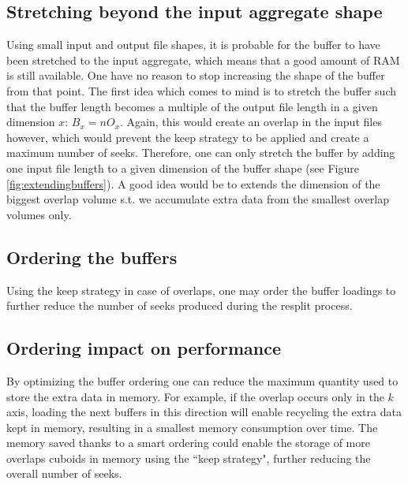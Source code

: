 \documentclass[conference]{IEEEtran}
\begin{document}
\subsection{Stretching beyond the input aggregate shape}

Using small input and output file shapes, it is probable for the buffer to have been stretched to the input aggregate, which means that a good amount of RAM is still available.
One have no reason to stop increasing the shape of the buffer from that point.
The first idea which comes to mind is to stretch the buffer such that the buffer length becomes a multiple of the output file length in a given dimension $x$: $B_x = nO_x$.
Again, this would create an overlap in the input files however, which would prevent the keep strategy to be applied and create a maximum number of seeks.
Therefore, one can only stretch the buffer by adding one input file length to a given dimension of the buffer shape (see Figure \ref{fig:extendingbuffers}).
A good idea would be to extends the dimension of the biggest overlap volume s.t. we accumulate extra data from the smallest overlap volumes only.

\subsection{Ordering the buffers}

Using the keep strategy in case of overlaps, one may order the buffer loadings to further reduce the number of seeks produced during the resplit process.

\subsection{Ordering impact on performance}
By optimizing the buffer ordering one can reduce the maximum quantity used to store the extra data in memory.
For example, if the overlap occurs only in the $k$ axis, loading the next buffers in this direction will enable recycling the extra data kept in memory, resulting in a smallest memory consumption over time.
The memory saved thanks to a smart ordering could enable the storage of more overlaps cuboids in memory using the ``keep strategy", further reducing the overall number of seeks. \\
\end{document}
